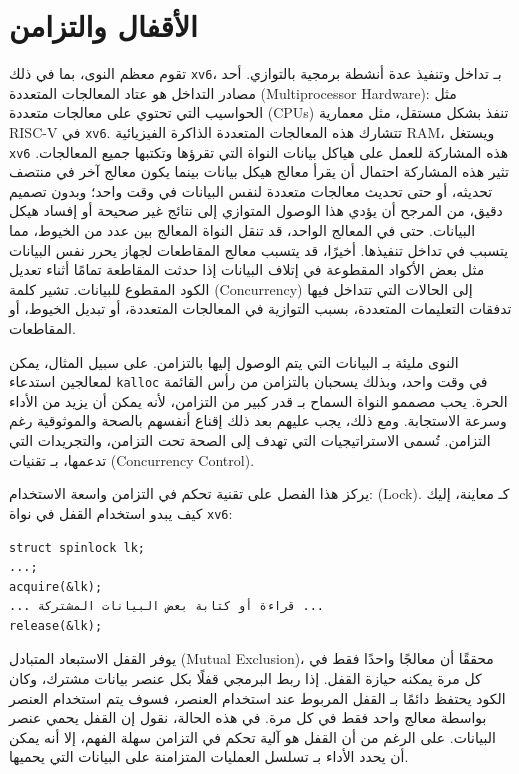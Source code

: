 \chapter{الأقفال والتزامن}
\label{CH:LOCK}

تقوم معظم النوى، بما في ذلك \texttt{xv6}، بـ تداخل وتنفيذ عدة أنشطة برمجية بالتوازي.
أحد مصادر التداخل هو عتاد المعالجات المتعددة (Multiprocessor Hardware): مثل الحواسيب التي تحتوي على معالجات متعددة (CPUs) تنفذ بشكل مستقل، مثل معمارية RISC-V في \texttt{xv6}.
تتشارك هذه المعالجات المتعددة الذاكرة الفيزيائية RAM، ويستغل \texttt{xv6} هذه المشاركة للعمل على هياكل بيانات النواة التي تقرؤها وتكتبها جميع المعالجات.
تثير هذه المشاركة احتمال أن يقرأ معالج هيكل بيانات بينما يكون معالج آخر في منتصف تحديثه، أو حتى تحديث معالجات متعددة لنفس البيانات في وقت واحد؛
وبدون تصميم دقيق، من المرجح أن يؤدي هذا الوصول المتوازي إلى نتائج غير صحيحة أو إفساد هيكل البيانات.
حتى في المعالج الواحد، قد تنقل النواة المعالج بين عدد من الخيوط، مما يتسبب في تداخل تنفيذها.
أخيرًا، قد يتسبب معالج المقاطعات لجهاز يحرر نفس البيانات مثل بعض الأكواد المقطوعة في إتلاف البيانات إذا حدثت المقاطعة تمامًا أثناء تعديل الكود المقطوع للبيانات.
تشير كلمة  (Concurrency) إلى الحالات التي تتداخل فيها تدفقات التعليمات المتعددة،
بسبب التوازية في المعالجات المتعددة، أو تبديل الخيوط، أو المقاطعات.

النوى مليئة بـ البيانات التي يتم الوصول إليها بالتزامن. على سبيل المثال، يمكن لمعالجين استدعاء {\tt kalloc} في وقت واحد، وبذلك يسحبان بالتزامن من رأس القائمة الحرة.
يحب مصممو النواة السماح بـ قدر كبير من التزامن، لأنه يمكن أن يزيد من الأداء وسرعة الاستجابة.
ومع ذلك، يجب عليهم بعد ذلك إقناع أنفسهم بالصحة والموثوقية رغم التزامن.
تُسمى الاستراتيجيات التي تهدف إلى الصحة تحت التزامن، والتجريدات التي تدعمها، بـ تقنيات  (Concurrency Control).

يركز هذا الفصل على تقنية تحكم في التزامن واسعة الاستخدام:  (Lock).
كـ معاينة، إليك كيف يبدو استخدام القفل في نواة \texttt{xv6}:
\begin{lstlisting}
struct spinlock lk;
...;
acquire(&lk);
... قراءة أو كتابة بعض البيانات المشتركة ...
release(&lk);
\end{lstlisting}

يوفر القفل الاستبعاد المتبادل (Mutual Exclusion)، محققًا أن معالجًا واحدًا فقط في كل مرة يمكنه حيازة القفل.
إذا ربط البرمجي قفلًا بكل عنصر بيانات مشترك، وكان الكود يحتفظ دائمًا بـ القفل المربوط عند استخدام العنصر، فسوف يتم استخدام العنصر بواسطة معالج واحد فقط في كل مرة.
في هذه الحالة، نقول إن القفل يحمي عنصر البيانات.
على الرغم من أن القفل هو آلية تحكم في التزامن سهلة الفهم، إلا أنه يمكن أن يحدد الأداء بـ تسلسل العمليات المتزامنة على البيانات التي يحميها.

